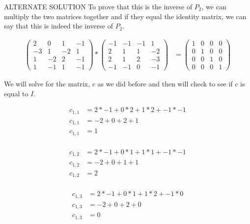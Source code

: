 \documentclass[12pt]{article}
\begin{document}
\begin{itemize}
ALTERNATE SOLUTION
\newline 
To prove that this is the inverse of $P_2$, we can multiply the two matrices together and if they equal the identity matrix, we can say that this is indeed the inverse of $P_2$.

\begin{align*}
    \begin{pmatrix}
    2 & 0 & 1 & -1\\
    -3 & 1 & -2 & 1 \\
    1 & -2 & 2 & -1 \\
    1 & -1 & 1 & -1
    \end{pmatrix} *
    \begin{pmatrix}
    -1 & -1 & -1 & 1\\
    2 & 1 & 1 & -2 \\
    2 & 1 & 2 & -3 \\
    -1 & -1 & 0 & -1
    \end{pmatrix} &= 
    \begin{pmatrix}
    1 & 0 & 0 & 0 \\
    0 & 1 & 0 & 0 \\
    0 & 0 & 1 & 0 \\
    0 & 0 & 0 & 1
    \end{pmatrix}
\end{align*}

We will solve for the matrix, $c$ as we did before and then will check to see if $c$ is equal to $I$. 

\begin{align*}
    c_{1,1} &= 2 * -1 + 0 * 2 + 1 * 2 + -1 * -1 \\
    c_{1,1} &= -2 + 0 + 2 + 1 \\
    c_{1,1} &= 1 \\
\end{align*}

\begin{align*}
    c_{1,2} &= 2 * -1 + 0 * 1 + 1 * 1 + -1 * -1 \\
    c_{1,2} &= -2 + 0 + 1 + 1 \\
    c_{1,2} &= 2 \\
\end{align*}

\begin{align*}
    c_{1,3} &= 2 * -1 + 0 * 1 + 1 * 2 + -1 * 0 \\
    c_{1,3} &= -2 + 0 + 2 + 0 \\
    c_{1,3} &= 0 \\
\end{align*}


\end{itemize}
\end{document}
